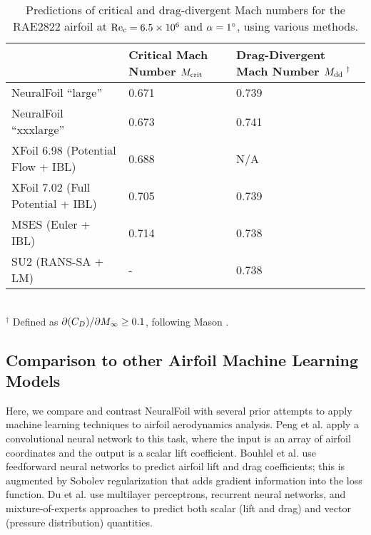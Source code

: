 \documentclass[journal]{new-aiaa}
\begin{document}
\begin{table}[H]

    \begin{centering}
        \caption{Predictions of critical and drag-divergent Mach numbers for the RAE2822 airfoil at $\rm Re_c=6.5 \times 10^6$ and $\alpha=1\degree$, using various methods.}
        \label{tab:transonic_validation}
        \begin{tabular}{lll}
            \toprule
                                              & Critical Mach Number $M_{\rm crit}$ & Drag-Divergent Mach Number $M_{\rm dd}\ ^{\dagger}$ \\ \midrule
            NeuralFoil ``large''              & 0.671                       & 0.739                                         \\
            NeuralFoil ``xxxlarge''           & 0.673                       & 0.741                                         \\
            XFoil 6.98 (Potential Flow + IBL) & 0.688                       & N/A                                           \\
            XFoil 7.02 (Full Potential + IBL) & 0.705                       & 0.739                                         \\
            MSES (Euler + IBL)                & 0.714                       & 0.738                                         \\
            SU2 (RANS-SA + LM)                & -                           & 0.738                                         \\ \bottomrule
        \end{tabular}
    \end{centering}
    \\
    $^{\dagger}$ Defined as $\partial(C_D)/\partial M_\infty \geq 0.1$, following Mason \cite{masonTransonicAerodynamicsAirfoils2006}.\\

\end{table}

\subsection{Comparison to other Airfoil Machine Learning Models}

Here, we compare and contrast NeuralFoil with several prior attempts to apply machine learning techniques to airfoil aerodynamics analysis. Peng et al. \cite{pengLearningAerodynamicsNeural2022} apply a convolutional neural network to this task, where the input is an array of airfoil coordinates and the output is a scalar lift coefficient. Bouhlel et al. \cite{bouhlelScalableGradientEnhanced2020} use feedforward neural networks to predict airfoil lift and drag coefficients; this is augmented by Sobolev regularization that adds gradient information into the loss function. Du et al. \cite{duRapidAirfoilDesign2021} use multilayer perceptrons, recurrent neural networks, and mixture-of-experts approaches to predict both scalar (lift and drag) and vector (pressure distribution) quantities.
\end{document}
